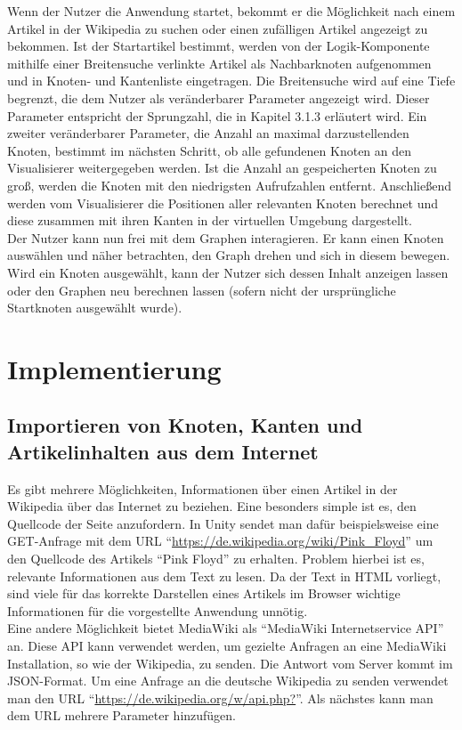 \documentclass[12pt, a4paper]{article}
\begin{document}
Wenn der Nutzer die Anwendung startet, bekommt er die Möglichkeit nach einem Artikel in der Wikipedia zu suchen oder einen zufälligen Artikel angezeigt zu bekommen. Ist der Startartikel bestimmt, werden von der Logik-Komponente mithilfe einer Breitensuche verlinkte Artikel als Nachbarknoten aufgenommen und in Knoten- und Kantenliste eingetragen. Die Breitensuche wird auf eine Tiefe begrenzt, die dem Nutzer als veränderbarer Parameter angezeigt wird. Dieser Parameter entspricht der Sprungzahl, die in Kapitel 3.1.3 erläutert wird. Ein zweiter veränderbarer Parameter, die Anzahl an maximal darzustellenden Knoten, bestimmt im nächsten Schritt, ob alle gefundenen Knoten an den Visualisierer weitergegeben werden. Ist die Anzahl an gespeicherten Knoten zu groß, werden die Knoten mit den niedrigsten Aufrufzahlen entfernt. Anschließend werden vom Visualisierer die Positionen aller relevanten Knoten berechnet und diese zusammen mit ihren Kanten in der virtuellen Umgebung dargestellt.\\

Der Nutzer kann nun frei mit dem Graphen interagieren. Er kann einen Knoten auswählen und näher betrachten, den Graph drehen und sich in diesem bewegen. Wird ein Knoten ausgewählt, kann der Nutzer sich dessen Inhalt anzeigen lassen oder den Graphen neu berechnen lassen (sofern nicht der ursprüngliche Startknoten ausgewählt wurde).\\

\newpage
\section{Implementierung}
\subsection{Importieren von Knoten, Kanten und Artikelinhalten aus dem Internet}
Es gibt mehrere Möglichkeiten, Informationen über einen Artikel in der Wikipedia über das Internet zu beziehen. Eine besonders simple ist es, den Quellcode der Seite anzufordern. In Unity sendet man dafür beispielsweise eine GET-Anfrage mit dem URL "`\url{https://de.wikipedia.org/wiki/Pink_Floyd}"' um den Quellcode des Artikels "`Pink Floyd"' zu erhalten. Problem hierbei ist es, relevante Informationen aus dem Text zu lesen. Da der Text in HTML vorliegt, sind viele für das korrekte Darstellen eines Artikels im Browser wichtige Informationen für die vorgestellte Anwendung unnötig.\\

Eine andere Möglichkeit bietet MediaWiki als "`MediaWiki Internetservice API"' an. Diese API kann verwendet werden, um gezielte Anfragen an eine MediaWiki Installation, so wie der Wikipedia, zu senden. Die Antwort vom Server kommt im JSON-Format. Um eine Anfrage an die deutsche Wikipedia zu senden verwendet man den URL "`\url{https://de.wikipedia.org/w/api.php?}"'. Als nächstes kann man dem URL mehrere Parameter hinzufügen.\\
\end{document}
